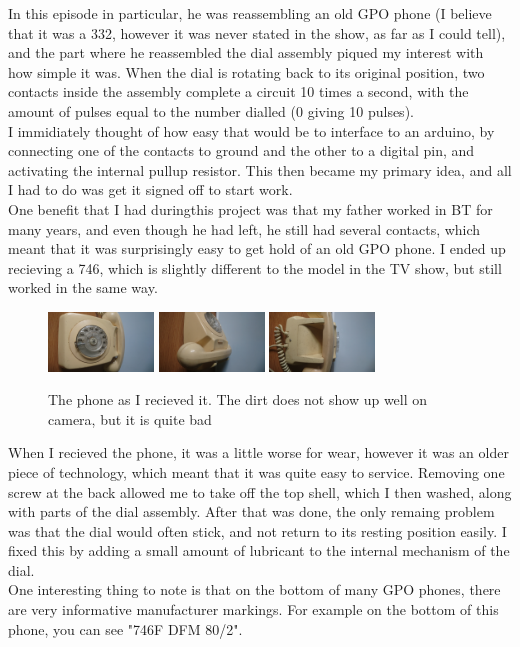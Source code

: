 \documentclass[12pt]{article}
\begin{document}
In this episode in particular, he was reassembling an old GPO phone 
(I believe that it was a 332, however it was never stated in the show, as far as I could tell),
and the part where he reassembled the dial assembly piqued my interest with how simple it was.
When the dial is rotating back to its original position, 
two contacts inside the assembly complete a circuit 10 times a second, 
with the amount of pulses equal to the number dialled (0 giving 10 pulses).\\
I immidiately thought of how easy that would be to interface to an arduino, 
by connecting one of the contacts to ground and the other to a digital pin, 
and activating the internal pullup resistor. This then became my primary idea, 
and all I had to do was get it signed off to start work.\\
One benefit that I had duringthis project was that my father worked in BT for many years,
and even though he had left, he still had several contacts, 
which meant that it was surprisingly easy to get hold of an old GPO phone.
I ended up recieving a 746, which is slightly different to the model in the TV show,
but still worked in the same way.\\

\begin{figure}[h]
    \centering
    \includegraphics[width=0.25\textwidth]{PhoneFront}
    \includegraphics[width=0.25\textwidth]{PhoneSide}
    \includegraphics[width=0.25\textwidth]{PhoneBack}
    \caption{The phone as I recieved it. The dirt does not show up well on camera, but it is quite bad}
\end{figure}

When I recieved the phone, it was a little worse for wear,
however it was an older piece of technology, which meant that it was quite easy to service.
Removing one screw at the back allowed me to take off the top shell, which I then washed,
along with parts of the dial assembly. After that was done, 
the only remaing problem was that the dial would often stick, 
and not return to its resting position easily. 
I fixed this by adding a small amount of lubricant to the internal mechanism of the dial.\\
One interesting thing to note is that on the bottom of many GPO phones, there are very informative manufacturer markings. For example on the bottom of this phone, you can see "746F DFM 80/2".
\end{document}
